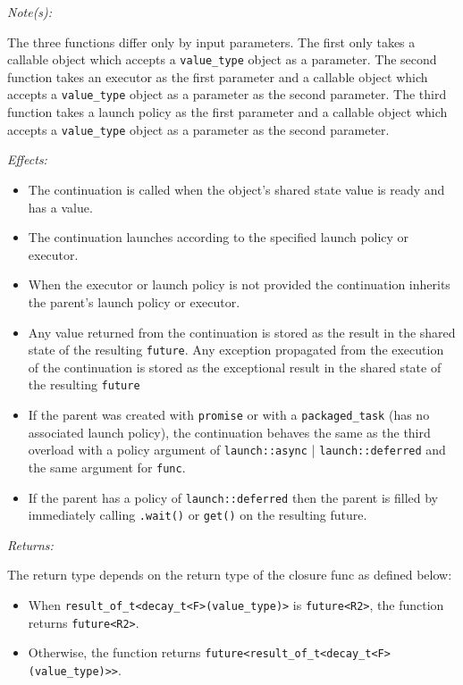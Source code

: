 \documentclass[a4paper,10pt]{article}
\newcommand{\cpp}[1]{\lstinline{#1}}
\newcommand{\wordingItem}[1]{\noindent\textit{#1:}}
\newenvironment{wordingPara}{\begin{adjustwidth}{12pt}{}}{\end{adjustwidth}}
\newenvironment{Effects}{\wordingItem{Effects}\vspace{7pt}\noindent\begin{adjustwidth}{12pt}{}}{\vspace{7pt}\end{adjustwidth}}
\newenvironment{Returns}{\wordingItem{Returns}\vspace{7pt}\noindent\begin{adjustwidth}{12pt}{}}{\vspace{7pt}\end{adjustwidth}}
\newenvironment{Notes}{\wordingItem{Note(s)}\vspace{7pt}\noindent\begin{adjustwidth}{12pt}{}}{\vspace{7pt}\end{adjustwidth}}
\begin{document}
\begin{wordingPara}

\begin{Notes}
The three functions differ only by input parameters. The first only takes a callable object which accepts a \cpp{value_type} object as a parameter. The second function takes an executor as the first parameter and a callable object which accepts a \cpp{value_type} object as a parameter as the second parameter. The third function takes a launch policy as the first parameter and a callable object which accepts a \cpp{value_type} object as a parameter as the second parameter.
\end{Notes}

\begin{Effects}
\begin{itemize}

\item The continuation is called when the object's shared state value is ready  and has a value. 
\item The continuation launches according to the specified launch policy or executor. 
\item When the executor or launch policy is not provided the continuation inherits the parent's 
launch policy or executor. 
\item Any value returned from the continuation is stored as the result in the shared state of the resulting \cpp{future}. 
Any exception propagated from the execution of the continuation is stored as the exceptional result in the shared state of the resulting \cpp{future}
\item If the parent was created with \cpp{promise} or with a \cpp{packaged_task} (has no associated launch 
policy), the continuation behaves the same as the third overload with a policy argument of 
\cpp{launch::async} | \cpp{launch::deferred} and the same argument for \cpp{func}.
 
\item If the parent has a policy of \cpp{launch::deferred} then the parent is filled by immediately calling \cpp{.wait()} or \cpp{get()} on the resulting future. 

\end{itemize}
\end{Effects}

\begin{Returns}
The return type depends on the return type of the closure func as defined below: 

\begin{itemize}
\item When \cpp{result_of_t<decay_t<F>(value_type)>} is \cpp{future<R2>}, the function returns \cpp{future<R2>}.
\item Otherwise, the function returns \cpp{future<result_of_t<decay_t<F>(value_type)>>}. 
\end{itemize}


\end{Returns}
\end{wordingPara}
\end{document}
